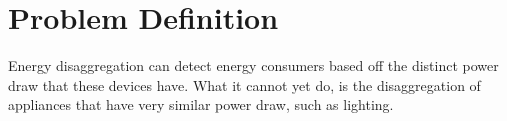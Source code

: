 

\section{Problem Definition}

Energy disaggregation can detect energy consumers based off the distinct power draw that these devices have.
What it cannot yet do, is the disaggregation of appliances that have very similar power draw, such as lighting.
